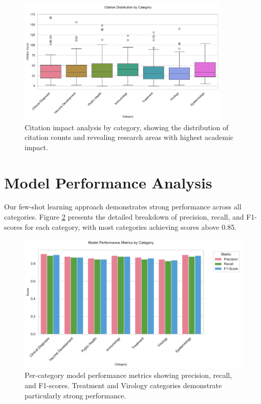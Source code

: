 \documentclass[12pt,a4paper]{article}
\begin{document}
\begin{figure}[H]
    \centering
    \includegraphics[width=0.9\textwidth]{dataset_citation_impact.pdf}
    \caption{Citation impact analysis by category, showing the distribution of citation counts and revealing research areas with highest academic impact.}
    \label{fig:citations}
\end{figure}

\section{Model Performance Analysis}
Our few-shot learning approach demonstrates strong performance across all categories. Figure \ref{fig:model_performance} presents the detailed breakdown of precision, recall, and F1-scores for each category, with most categories achieving scores above 0.85.

\begin{figure}[H]
    \centering
    \includegraphics[width=\textwidth]{model_category_performance.pdf}
    \caption{Per-category model performance metrics showing precision, recall, and F1-scores. Treatment and Virology categories demonstrate particularly strong performance.}
    \label{fig:model_performance}
\end{figure}
\end{document}
